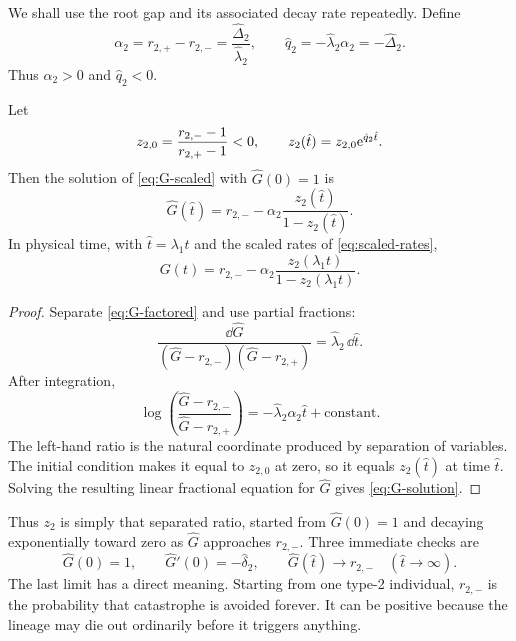 We shall use the root gap and its associated decay rate repeatedly. Define
\begin{equation}
\label{eq:type2-alpha-q}
\alpha_2=r_{2,+}-r_{2,-}
=\frac{\hat\Delta_2}{\hat\lambda_2},
\qquad
\hat q_2=-\hat\lambda_2\alpha_2=-\hat\Delta_2.
\end{equation}
Thus $\alpha_2>0$ and $\hat q_2<0$.

\begin{proposition}
\label{prop:G-solution}
Let
\begin{equation}
\label{eq:type2-z}
z_{2,0}=\frac{r_{2,-}-1}{r_{2,+}-1}<0,
\qquad
z_2(\hat t)=z_{2,0}\mathrm e^{\hat q_2\hat t}.
\end{equation}
Then the solution of \cref{eq:G-scaled} with $\widehat G(0)=1$ is
\begin{equation}
\label{eq:G-solution}
\widehat G(\hat t)
=r_{2,-}-\alpha_2\frac{z_2(\hat t)}{1-z_2(\hat t)}.
\end{equation}
In physical time, with $\hat t=\lambda_1t$ and the scaled rates of \cref{eq:scaled-rates},
\begin{equation*}
G(t)
=r_{2,-}-\alpha_2\frac{z_2(\lambda_1t)}{1-z_2(\lambda_1t)}.
\end{equation*}
\end{proposition}

\begin{proof}
Separate \cref{eq:G-factored} and use partial fractions:
\[
\frac{\dd\widehat G}
{(\widehat G-r_{2,-})(\widehat G-r_{2,+})}
=\hat\lambda_2\,\dd\hat t.
\]
After integration,
\[
\log\!\left(
\frac{\widehat G-r_{2,-}}{\widehat G-r_{2,+}}
\right)
=-\hat\lambda_2\alpha_2\hat t+\text{constant}.
\]
The left-hand ratio is the natural coordinate produced by separation of variables. The initial condition makes it equal to $z_{2,0}$ at zero, so it equals $z_2(\hat t)$ at time $\hat t$. Solving the resulting linear fractional equation for $\widehat G$ gives \cref{eq:G-solution}.
\end{proof}

Thus $z_2$ is simply that separated ratio, started from $\widehat G(0)=1$ and decaying exponentially toward zero as $\widehat G$ approaches $r_{2,-}$. Three immediate checks are
\begin{equation*}
\widehat G(0)=1,
\qquad
\widehat G'(0)=-\hat\delta_2,
\qquad
\widehat G(\hat t)\longrightarrow r_{2,-}
\quad(\hat t\to\infty).
\end{equation*}
The last limit has a direct meaning. Starting from one type-2 individual, $r_{2,-}$ is the probability that catastrophe is avoided forever. It can be positive because the lineage may die out ordinarily before it triggers anything.

